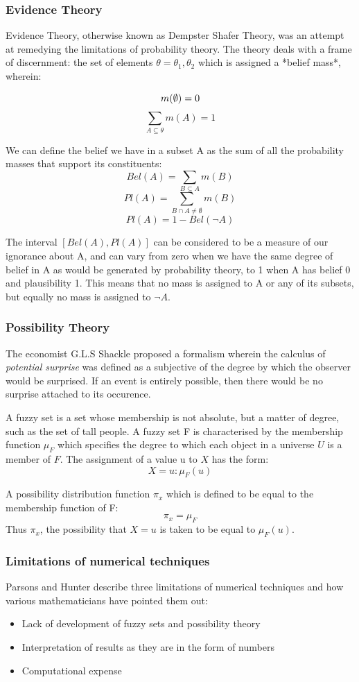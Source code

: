 \documentclass[UTF8]{article}
\begin{document}
\subsubsection{Evidence Theory}
Evidence Theory, otherwise known as Dempster Shafer Theory, was an attempt at remedying the limitations of probability theory. The theory deals with a frame of discernment: the set of elements $\theta = {\theta_1, \theta_2}$ which is assigned a *belief mass*, wherein:

$$
m(\emptyset) = 0\\
$$
$$
\sum\limits_{A \subseteq \theta} m(A) = 1
$$

We can define the belief we have in a subset A as the sum of all the probability masses that support its constituents:
$$
Bel(A) = \sum\limits_{B \subseteq A} m(B)
$$
$$
Pl(A) = \sum\limits_{B \cap A \neq \emptyset} m(B)
$$
$$
Pl(A) = 1 - Bel(\neg A)
$$

The interval $[Bel(A), Pl(A)]$ can be considered to be a measure of our ignorance about A, and can vary from zero when we have the same degree of belief in A as would be generated by probability theory, to 1 when A has belief 0 and plausibility 1. This means that no mass is assigned to A or any of its subsets, but equally no mass is assigned to $\neg A$.

\subsubsection{Possibility Theory}
The economist G.L.S Shackle proposed a formalism wherein the calculus of \textit{potential surprise} was defined as a subjective of the degree by which the observer would be surprised. If an event is entirely possible, then there would be no surprise attached to its occurence.

A fuzzy set is a set whose membership is not absolute, but a matter of degree, such as the set of tall people. A fuzzy set F is characterised by the membership function $\mu_F$ which specifies the degree to which each object in a universe $U$ is a member of $F$. The assignment of a value u to $X$ has the form:
$$
X = u : \mu_F(u)
$$

A possibility distribution function $\pi_x$ which is defined to be equal to the membership function of F: 
$$
\pi_x = \mu_F
$$
Thus $\pi_x$, the possibility that $X = u$ is taken to be equal to $\mu_F(u)$.
\subsubsection{Limitations of numerical techniques}
Parsons and Hunter describe three limitations of numerical techniques and how various mathematicians have pointed them out:
\begin{itemize}
    \item Lack of development of fuzzy sets and possibility theory
    \item Interpretation of results as they are in the form of numbers
    \item Computational expense
\end{itemize} 
\end{document}
